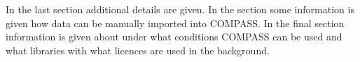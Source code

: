 In the last section  additional details are given. In the section  some information is given how data can be manually imported into COMPASS. In the final section  information is given about under what conditions COMPASS can be used and what 
libraries with what licences are used in the background.

\pagebreak












